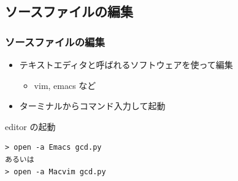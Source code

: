 \subsection{ソースファイルの編集}
\begin{frame}[containsverbatim]
\frametitle{ソースファイルの編集}
  \begin{itemize}
\item テキストエディタと呼ばれるソフトウェアを使って編集
    \begin{itemize}
\item vim, emacs など
    \end{itemize}
\item ターミナルからコマンド入力して起動
  \end{itemize}
  \begin{itembox}{editor の起動}
\scriptsize
    \begin{verbatim}
> open -a Emacs gcd.py
あるいは
> open -a Macvim gcd.py
    \end{verbatim}
  \end{itembox}
\end{frame}
%
%
